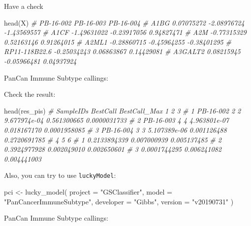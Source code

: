 \documentclass[
  12pt,
]{book}
\newenvironment{Shaded}{\begin{snugshade}}{\end{snugshade}}
\newcommand{\AttributeTok}[1]{\textcolor[rgb]{0.77,0.63,0.00}{#1}}
\newcommand{\CommentTok}[1]{\textcolor[rgb]{0.56,0.35,0.01}{\textit{#1}}}
\newcommand{\FunctionTok}[1]{\textcolor[rgb]{0.00,0.00,0.00}{#1}}
\newcommand{\NormalTok}[1]{#1}
\newcommand{\OtherTok}[1]{\textcolor[rgb]{0.56,0.35,0.01}{#1}}
\newcommand{\StringTok}[1]{\textcolor[rgb]{0.31,0.60,0.02}{#1}}
\begin{document}
Have a check

\begin{Shaded}
\begin{Highlighting}[]
\FunctionTok{head}\NormalTok{(X)}
\CommentTok{\#                 PB{-}16{-}002   PB{-}16{-}003   PB{-}16{-}004}
\CommentTok{\# A1BG           0.07075272 {-}2.08976724 {-}1.43569557}
\CommentTok{\# A1CF          {-}1.49631022 {-}0.23917056  0.94827471}
\CommentTok{\# A2M           {-}0.77315329  0.52163146  0.91264015}
\CommentTok{\# A2ML1         {-}0.28860715 {-}0.45964255 {-}0.38401295}
\CommentTok{\# RP11{-}118B22.6 {-}0.25034243  0.06863867  0.14429081}
\CommentTok{\# A3GALT2        0.08215945 {-}0.05966481  0.04937924}
\end{Highlighting}
\end{Shaded}

PanCan Immune Subtype callings:

Check the result:

\begin{Shaded}
\begin{Highlighting}[]
\FunctionTok{head}\NormalTok{(res\_pis)}
\CommentTok{\#   SampleIDs BestCall BestCall\_Max            1           2            3}
\CommentTok{\# 1 PB{-}16{-}002        2            2 9.677974e{-}04 0.561300665 0.0000031733}
\CommentTok{\# 2 PB{-}16{-}003        4            4 4.963801e{-}07 0.018167170 0.0001958085}
\CommentTok{\# 3 PB{-}16{-}004        3            3 5.107389e{-}06 0.001126488 0.2720691785}
\CommentTok{\#              4           5           6}
\CommentTok{\# 1 0.2133894339 0.007000939 0.005137485}
\CommentTok{\# 2 0.3924977928 0.002049010 0.002650601}
\CommentTok{\# 3 0.0001744295 0.006241082 0.004441003}
\end{Highlighting}
\end{Shaded}

Also, you can try to use \texttt{luckyModel}:

\begin{Shaded}
\begin{Highlighting}[]
\NormalTok{pci }\OtherTok{\textless{}{-}} \FunctionTok{lucky\_model}\NormalTok{(}
  \AttributeTok{project =} \StringTok{"GSClassifier"}\NormalTok{,}
  \AttributeTok{model =} \StringTok{"PanCancerImmuneSubtype"}\NormalTok{,}
  \AttributeTok{developer =} \StringTok{"Gibbs"}\NormalTok{,}
  \AttributeTok{version =} \StringTok{"v20190731"}
\NormalTok{)}
\end{Highlighting}
\end{Shaded}

PanCan Immune Subtype callings:
\end{document}
